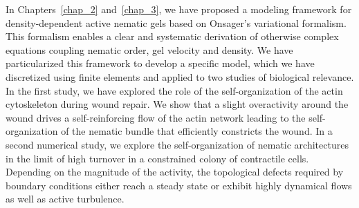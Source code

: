In Chapters~\ref{chap_2} and~\ref{chap_3}, we have proposed a modeling framework for density-dependent active nematic gels based on Onsager's variational formalism. This formalism enables a clear and systematic derivation of otherwise complex equations coupling nematic order, gel velocity and density. We have particularized this framework to develop a specific model, which we have discretized using finite elements and applied to two studies of biological relevance. In the first study, we have explored the role of the self-organization of the actin cytoskeleton during wound repair. We show that a slight overactivity around the wound drives a self-reinforcing flow of the actin network leading to the self-organization of the nematic bundle that efficiently constricts the wound. In a second numerical study, we explore the self-organization of nematic architectures in the limit of high turnover in a constrained colony of contractile cells. Depending on the magnitude of the activity, the topological defects required by boundary conditions either reach a steady state or exhibit highly dynamical flows as well as active turbulence.



\newpage
